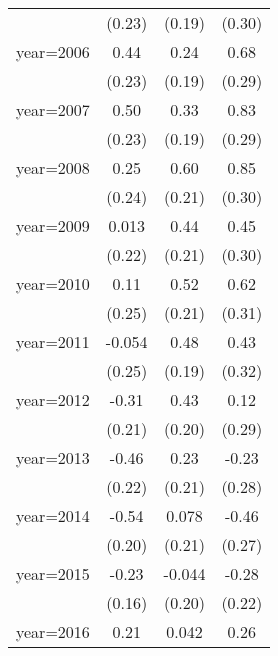 \begin{sidewaystable}[htbp]
\begin{tabular}{l*{3}{c}}
                &   (0.23)         &   (0.19)         &   (0.30)         \\
\addlinespace
year=2006       &     0.44\sym{*}  &     0.24         &     0.68\sym{**} \\
                &   (0.23)         &   (0.19)         &   (0.29)         \\
\addlinespace
year=2007       &     0.50\sym{**} &     0.33\sym{*}  &     0.83\sym{***}\\
                &   (0.23)         &   (0.19)         &   (0.29)         \\
\addlinespace
year=2008       &     0.25         &     0.60\sym{***}&     0.85\sym{***}\\
                &   (0.24)         &   (0.21)         &   (0.30)         \\
\addlinespace
year=2009       &    0.013         &     0.44\sym{**} &     0.45         \\
                &   (0.22)         &   (0.21)         &   (0.30)         \\
\addlinespace
year=2010       &     0.11         &     0.52\sym{**} &     0.62\sym{*}  \\
                &   (0.25)         &   (0.21)         &   (0.31)         \\
\addlinespace
year=2011       &   -0.054         &     0.48\sym{**} &     0.43         \\
                &   (0.25)         &   (0.19)         &   (0.32)         \\
\addlinespace
year=2012       &    -0.31         &     0.43\sym{**} &     0.12         \\
                &   (0.21)         &   (0.20)         &   (0.29)         \\
\addlinespace
year=2013       &    -0.46\sym{**} &     0.23         &    -0.23         \\
                &   (0.22)         &   (0.21)         &   (0.28)         \\
\addlinespace
year=2014       &    -0.54\sym{***}&    0.078         &    -0.46\sym{*}  \\
                &   (0.20)         &   (0.21)         &   (0.27)         \\
\addlinespace
year=2015       &    -0.23         &   -0.044         &    -0.28         \\
                &   (0.16)         &   (0.20)         &   (0.22)         \\
\addlinespace
year=2016       &     0.21\sym{***}&    0.042         &     0.26\sym{*}  \\

\end{tabular}
\end{sidewaystable}
